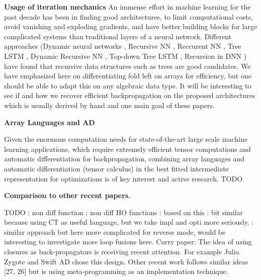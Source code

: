 \noindent \textbf{Usage of iteration mechanics}
An immense effort in machine learning for the past decade has been in finding
good architectures, to limit computational costs, 
avoid vanishing and exploding gradients, 
and have better building blocks for large complicated systems than traditional layers of a neural network.
Different approaches 
(Dynamic neural networks \cite{jin2017manipulability,wu2016deep}, 
Recursive NN \cite{socher2011parsing,biancofiore2017recursive}, 
Reccurent NN \cite{bahdanau2014neural,luong2015effective}, 
Tree LSTM \cite{tai2015improved,chen2016enhanced}, 
Dynamic Recursive NN \cite{guo2019dynamic}, 
Top-down Tree LSTM \cite{zhang2015top}, 
Recursion in DNN \cite{jeong2018improving}) 
have found that recursive data structures such as trees are good candidates.
We have emphasized here on differentiating fold left on arrays for efficiency, 
but one should be able to adapt this on any algebraic data type. 
It will be interesting to see if and how we recover efficient backpropagation on the proposed architectures 
which is usually derived by hand and one main goal of these papers.

\noindent \textbf{Array Languages and AD}

Given the enormous computation needs for state-of-the-art large scale machine learning applications, 
which require extremely efficient tensor computations and automatic differentiation for backpropagation, 
combining array languages and automatic differentiation (tensor calculus) in the best 
fitted intermediate representation for optimizations is of key interest and active research.
\cite{bernstein2020differentiating} 
TODO
\cite{laue2018computing,laue2020simple}

\noindent \textbf{Comparison to other recent papers.}

TODO
\cite{lee2020correctness}: non diff function
\cite{sherman2021}: non diff HO functions
\cite{pearlmutter2008reverse}: based on this
\cite{elliott2018simple}: bit similar because using CT as useful language, but we take impl and opti more seriously.
\cite{shaikhha2019efficient}: similar approach but here more complicated for reverse mode, would be interesting to investigate more loop fusions here.
\cite{paszke2021getting}
Curry paper: The idea of using closures as back-propagators is receiving recent attention. 
    For example Julia Zygote \cite{innes2019zygote} and Swift AD \cite{wei2018first} chose this design. 
    Other recent work follows similar ideas [27, 26] but is using meta-programming as an implementation technique.

